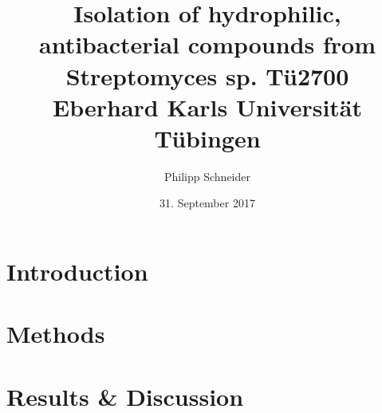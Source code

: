 \documentclass[12pt, twoside]{article}
\title{
	{Isolation of hydrophilic, antibacterial compounds from Streptomyces sp. Tü2700}\\
	{\large Eberhard Karls Universit{}ät Tübingen}\\
}
\author{Philipp Schneider}{}
\date{31. September 2017}
\begin{document}





\tableofcontents
\listoffigures
\listoftables

\section{Introduction}


\section{Methods}


\section{Results \& Discussion}


%

%
\end{document}
